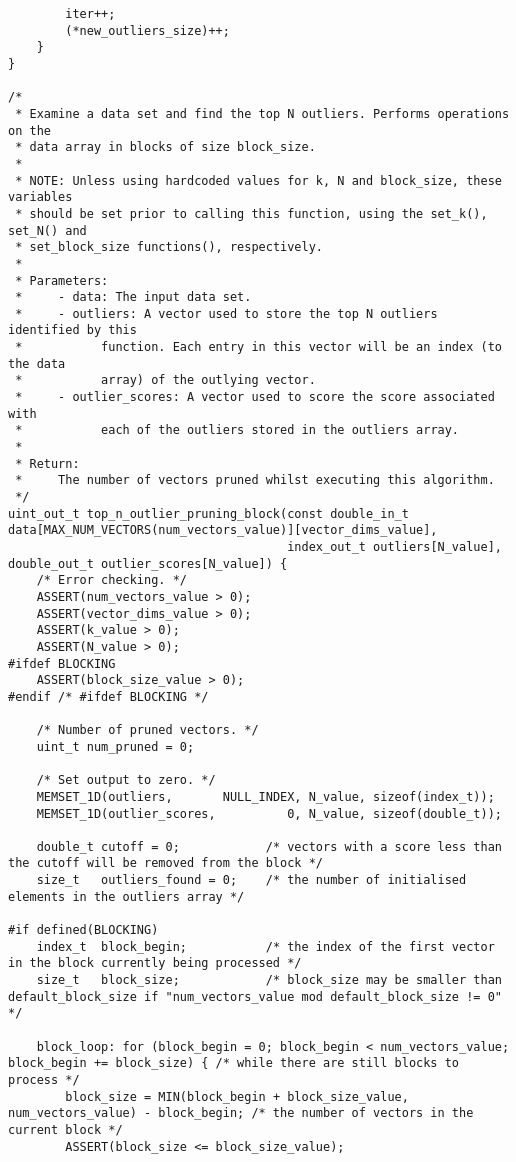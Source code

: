 \begin{lstlisting}
        iter++;
        (*new_outliers_size)++;
    }
}

/*
 * Examine a data set and find the top N outliers. Performs operations on the
 * data array in blocks of size block_size.
 *
 * NOTE: Unless using hardcoded values for k, N and block_size, these variables
 * should be set prior to calling this function, using the set_k(), set_N() and
 * set_block_size functions(), respectively.
 *
 * Parameters:
 *     - data: The input data set.
 *     - outliers: A vector used to store the top N outliers identified by this
 *           function. Each entry in this vector will be an index (to the data
 *           array) of the outlying vector.
 *     - outlier_scores: A vector used to score the score associated with
 *           each of the outliers stored in the outliers array.
 *
 * Return:
 *     The number of vectors pruned whilst executing this algorithm.
 */
uint_out_t top_n_outlier_pruning_block(const double_in_t data[MAX_NUM_VECTORS(num_vectors_value)][vector_dims_value],
                                       index_out_t outliers[N_value], double_out_t outlier_scores[N_value]) {
    /* Error checking. */
    ASSERT(num_vectors_value > 0);
    ASSERT(vector_dims_value > 0);
    ASSERT(k_value > 0);
    ASSERT(N_value > 0);
#ifdef BLOCKING
    ASSERT(block_size_value > 0);
#endif /* #ifdef BLOCKING */

    /* Number of pruned vectors. */
    uint_t num_pruned = 0;
    
    /* Set output to zero. */
    MEMSET_1D(outliers,       NULL_INDEX, N_value, sizeof(index_t));
    MEMSET_1D(outlier_scores,          0, N_value, sizeof(double_t));
    
    double_t cutoff = 0;            /* vectors with a score less than the cutoff will be removed from the block */
    size_t   outliers_found = 0;    /* the number of initialised elements in the outliers array */
    
#if defined(BLOCKING)
    index_t  block_begin;           /* the index of the first vector in the block currently being processed */
    size_t   block_size;            /* block_size may be smaller than default_block_size if "num_vectors_value mod default_block_size != 0" */
    
    block_loop: for (block_begin = 0; block_begin < num_vectors_value; block_begin += block_size) { /* while there are still blocks to process */
        block_size = MIN(block_begin + block_size_value, num_vectors_value) - block_begin; /* the number of vectors in the current block */
        ASSERT(block_size <= block_size_value);
        

\end{lstlisting}
